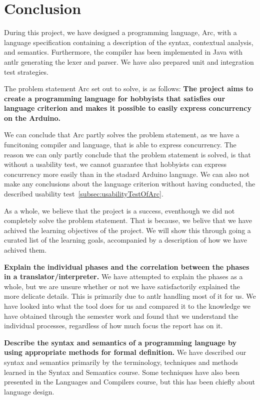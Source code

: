 \chapter{Conclusion}\label{cha:conclusion}

During this project, we have designed a programming language, Arc, with a language specification containing a description of the syntax, contextual analysis, and semantics. Furthermore, the compiler has been implemented in Java with \gls{antlr} generating the lexer and parser. We have also prepared unit and integration test strategies.

The problem statement Arc set out to solve, is as follows: 
\textbf{The project aims to create a programming language for hobbyists that satisfies our language criterion and makes it possible to easily express concurrency on the Arduino.}

We can conclude that Arc partly solves the problem statement, as we have a funcitoning compiler and language, that is able to express concurrency. The reason we can only partly conclude that the problem statement is solved, is that without a usability test, we cannot guarantee that hobbyists can express concurrency more easily than in the stadard Arduino language. We can also not make any conclusions about the language criterion without having conducted, the described usability test~\ref{subsec:usabilityTestOfArc}.

As a whole, we believe that the project is a success, eventhough we did not completely solve the problem statement. That is because, we belive that we have achived the learning objectives of the project. We will show this through going a curated list of the learning goals, accompanied by a description of how we have achived them.

\textbf{Explain the individual phases and the correlation between the phases in a translator/interpreter.} We have attempted to explain the phases as a whole, but we are unsure whether or not we have satisfactorily explained the more delicate details. This is primarily due to \gls{antlr} handling most of it for us. We have looked into what the tool does for us and compared it to the knowledge we have obtained through the semester work and found that we understand the individual processes, regardless of how much focus the report has on it.

\textbf{Describe the syntax and semantics of a programming language by using appropriate methods for formal definition.} We have described our syntax and semantics primarily by the terminology, techniques and methods learned in the Syntax and Semantics course. Some techniques have also been presented in the Languages and Compilers course, but this has been chiefly about language design.


